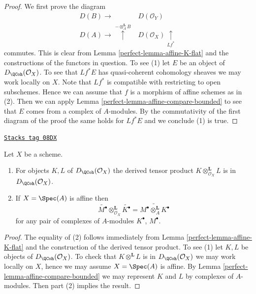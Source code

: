 \begin{proof}

We first prove the diagram
$$
\begin{array}{cc}D(B) \longrightarrow & D(\mathcal{O}_Y) \\ D(A) \longrightarrow\overset{- \otimes_A^\mathbf{L} B}{\uparrow} & D(\mathcal{O}_X) \underset{Lf^*}{\uparrow}\end{array}
$$
commutes. This is clear from Lemma \ref{perfect-lemma-affine-K-flat} and
the constructions of the functors in question. To see (1) let
$E$ be an object of $D_\QCoh(\mathcal{O}_X)$. To see that
$Lf^*E$ has quasi-coherent cohomology sheaves we may work locally on $X$.
Note that $Lf^*$ is compatible with restricting to open subschemes.
Hence we can assume that $f$ is a morphism of affine schemes as in (2).
Then we can apply Lemma \ref{perfect-lemma-affine-compare-bounded} to see that
$E$ comes from a complex of $A$-modules. By the commutativity of the first
diagram of the proof the same holds for $Lf^*E$ and we conclude (1) is true.
\end{proof}

\begin{lemma}
\label{perfect-lemma-quasi-coherence-tensor-product}
\href{https://stacks.math.columbia.edu/tag/08DX}{\texttt{Stacks tag 08DX}}

Let $X$ be a scheme.
\begin{enumerate}
\item For objects $K, L$ of $D_\QCoh(\mathcal{O}_X)$
the derived tensor product $K \otimes^\mathbf{L}_{\mathcal{O}_X} L$ is in
$D_\QCoh(\mathcal{O}_X)$.
\item If $X = \Spec(A)$ is affine then
$$
\widetilde{M^\bullet} \otimes_{\mathcal{O}_X}^\mathbf{L} \widetilde{K^\bullet}
=
\widetilde{M^\bullet \otimes_A^\mathbf{L} K^\bullet}
$$
for any pair of complexes of $A$-modules $K^\bullet$, $M^\bullet$.
\end{enumerate}
\end{lemma}

\begin{proof}

The equality of (2) follows immediately from Lemma \ref{perfect-lemma-affine-K-flat}
and the construction of the derived tensor product.
To see (1) let $K, L$ be objects of $D_\QCoh(\mathcal{O}_X)$.
To check that $K \otimes^\mathbf{L} L$ is in
$D_\QCoh(\mathcal{O}_X)$ we may work locally on $X$, hence
we may assume $X = \Spec(A)$ is affine. By
Lemma \ref{perfect-lemma-affine-compare-bounded} we may represent
$K$ and $L$ by complexes of $A$-modules. Then part (2) implies
the result.
\end{proof}

